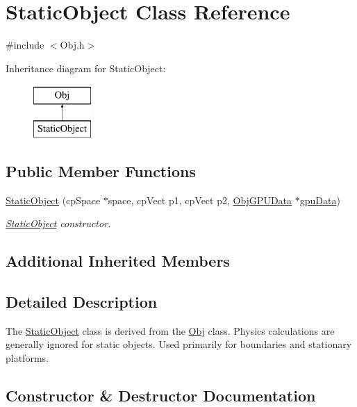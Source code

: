 \hypertarget{class_static_object}{}\section{Static\+Object Class Reference}
\label{class_static_object}


{\ttfamily \#include $<$Obj.\+h$>$}

Inheritance diagram for Static\+Object\+:\begin{figure}[H]
\begin{center}
\leavevmode
\includegraphics[height=2.000000cm]{class_static_object}
\end{center}
\end{figure}
\subsection*{Public Member Functions}
\begin{DoxyCompactItemize}
\item 
\hyperlink{class_static_object_a7d12320f994eb290f969717744bd328b}{Static\+Object} (cp\+Space $\ast$space, cp\+Vect p1, cp\+Vect p2, \hyperlink{class_obj_g_p_u_data}{Obj\+G\+P\+U\+Data} $\ast$\hyperlink{class_obj_a33a9a5371319a410f7d2d395a7ef2423}{gpu\+Data})
\begin{DoxyCompactList}\small\item\em \hyperlink{class_static_object}{Static\+Object} constructor. \end{DoxyCompactList}\end{DoxyCompactItemize}
\subsection*{Additional Inherited Members}


\subsection{Detailed Description}
The \hyperlink{class_static_object}{Static\+Object} class is derived from the \hyperlink{class_obj}{Obj} class. Physics calculations are generally ignored for static objects. Used primarily for boundaries and stationary platforms. 

\subsection{Constructor \& Destructor Documentation}
